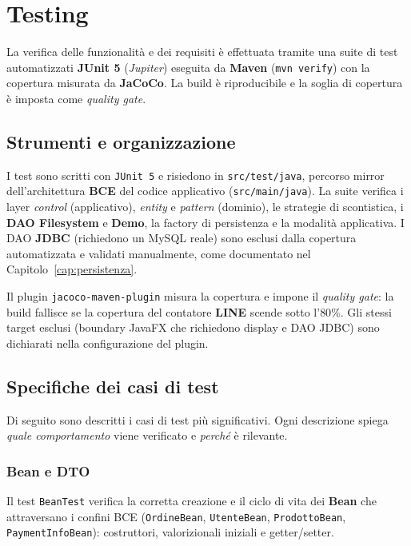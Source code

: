 \chapter{Testing}
\label{cap:testing}

La verifica delle funzionalità e dei requisiti è effettuata tramite una suite di
test automatizzati \textbf{JUnit 5} (\emph{Jupiter}) eseguita da \textbf{Maven}
(\texttt{mvn verify}) con la copertura misurata da \textbf{JaCoCo}. La build è
riproducibile e la soglia di copertura è imposta come \emph{quality gate}.

\section{Strumenti e organizzazione}
\label{sec:testing_strumenti}


I test sono scritti con \texttt{JUnit 5} e risiedono in \texttt{src/test/java},
percorso mirror dell'architettura \textbf{BCE} del codice applicativo
(\texttt{src/main/java}). La suite verifica i layer \emph{control} (applicativo),
\emph{entity} e \emph{pattern} (dominio), le strategie di scontistica, i
\textbf{DAO Filesystem} e \textbf{Demo}, la factory di persistenza e la modalità
applicativa. I DAO \textbf{JDBC} (richiedono un MySQL reale) sono esclusi dalla
copertura automatizzata e validati manualmente, come documentato nel
Capitolo~\ref{cap:persistenza}.

Il plugin \texttt{jacoco-maven-plugin} misura la copertura e impone il
\emph{quality gate}: la build fallisce se la copertura del contatore
\textbf{LINE} scende sotto l'\(80\%\). Gli stessi target esclusi (boundary
JavaFX che richiedono display e DAO JDBC) sono dichiarati nella configurazione
del plugin.

\section{Specifiche dei casi di test}
\label{sec:testing_specifiche}

Di seguito sono descritti i casi di test più significativi. Ogni descrizione
spiega \emph{quale comportamento} viene verificato e \emph{perché} è rilevante.

\subsection{Bean e DTO}
Il test \texttt{BeanTest} verifica la corretta creazione e il ciclo di vita dei
\textbf{Bean} che attraversano i confini BCE (\texttt{OrdineBean},
\texttt{UtenteBean}, \texttt{ProdottoBean}, \texttt{PaymentInfoBean}):
costruttori, valorizionali iniziali e getter/setter.

